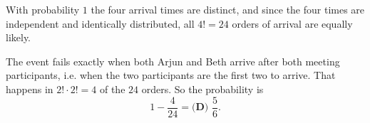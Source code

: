 With probability $1$ the four arrival times are distinct, and since the four times are independent and identically distributed, all $4!=24$ orders of arrival are equally likely.

The event fails exactly when both Arjun and Beth arrive after both meeting participants, i.e. when the two participants are the first two to arrive. That happens in $2!\cdot2!=4$ of the $24$ orders. So the probability is
\[1-\dfrac{4}{24}=\boxed{\textbf{(D) }\dfrac56}.\]
